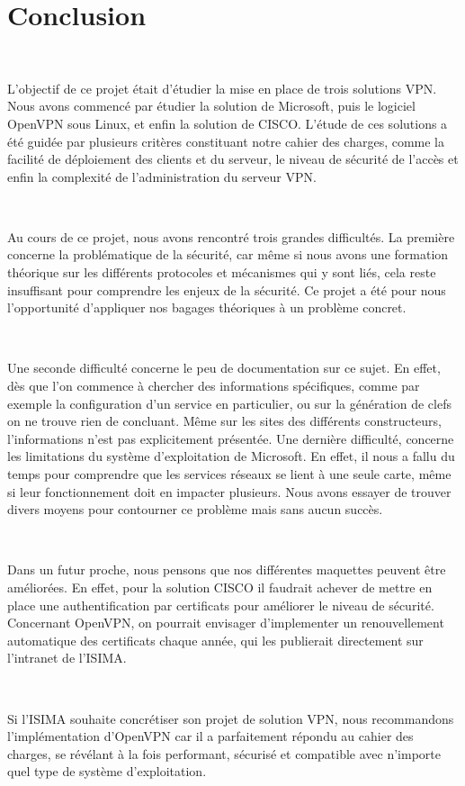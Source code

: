 \section*{Conclusion}

~

L'objectif de ce projet était d'étudier la mise en place de trois solutions VPN. Nous avons commencé par étudier la solution de Microsoft, puis le logiciel OpenVPN sous Linux, et enfin la solution de CISCO. L'étude de ces solutions a été guidée par plusieurs critères constituant notre cahier des charges, comme la facilité de déploiement des clients et du serveur, le niveau de sécurité de l'accès et enfin la complexité de l'administration du serveur VPN.

~

Au cours de ce projet, nous avons rencontré trois grandes difficultés. La première concerne la problématique de la sécurité, car même si nous avons une formation théorique sur les différents protocoles et mécanismes qui y sont liés, cela reste insuffisant pour comprendre les enjeux de la sécurité. Ce projet a été pour nous l'opportunité d'appliquer nos bagages théoriques à un problème concret.

~

Une seconde difficulté concerne le peu de documentation sur ce sujet. En effet, dès que l'on commence à chercher des informations spécifiques, comme par exemple la configuration d'un service en particulier, ou sur la génération de clefs on ne trouve rien de concluant. Même sur les sites des différents constructeurs, l'informations n'est pas explicitement présentée.
Une dernière difficulté, concerne les limitations du système d'exploitation de Microsoft. En effet, il nous a fallu du temps pour comprendre que les services réseaux se lient à une seule carte, même si leur fonctionnement doit en impacter plusieurs. Nous avons essayer de trouver divers moyens pour contourner ce problème mais sans aucun succès.

~

Dans un futur proche, nous pensons que nos différentes maquettes peuvent être améliorées. En effet, pour la solution CISCO il faudrait achever de mettre en place une authentification par certificats pour améliorer le niveau de sécurité. Concernant OpenVPN, on pourrait envisager d'implementer un renouvellement automatique des certificats chaque année, qui les publierait directement sur l'intranet de l'ISIMA.

~

Si l'ISIMA souhaite concrétiser son projet de solution VPN, nous recommandons l'implémentation d'OpenVPN car il a parfaitement répondu au cahier des charges, se révélant à la fois performant, sécurisé et compatible avec n'importe quel type de système d'exploitation.

\pagebreak
